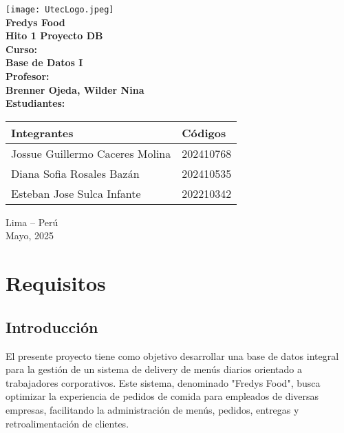 \documentclass[12pt,a4paper]{article}
\begin{document}
\begin{center}
    \texttt{[image: UtecLogo.jpeg]} \\
    \vspace{1cm}
    \normalsize \textbf{Fredys Food} \\
    \vspace{1cm}
    \textbf{Hito 1 Proyecto DB} \\
    \vspace{0.5cm}
    \textbf{Curso:} \\
    \textbf{Base de Datos I} \\
    \vspace{0.5cm}
    \textbf{Profesor:} \\
    \textbf{Brenner Ojeda, Wilder Nina} \\
    \vspace{0.5cm}
    \textbf{Estudiantes:}
\end{center}

\vspace{0.5cm}

\begin{table}[h]
    \centering
    \begin{tabular}{|>{\raggedright\arraybackslash}m{6cm}|m{3cm}|}
    \hline
    \textbf{Integrantes} & \textbf{Códigos} \\ \hline
    Jossue Guillermo Caceres Molina & 202410768 \\ \hline
    Diana Sofia Rosales Bazán & 202410535 \\ \hline
    Esteban Jose Sulca Infante & 202210342 \\ \hline
    \end{tabular}
\end{table}

\vfill
\begin{center}
    Lima -- Perú \\
    Mayo, 2025
\end{center}

\newpage

\tableofcontents
\newpage

\section{Requisitos}
\subsection{Introducción}
El presente proyecto tiene como objetivo desarrollar una base de datos integral para la gestión de un sistema de delivery de menús diarios orientado a trabajadores corporativos. Este sistema, denominado "Fredys Food", busca optimizar la experiencia de pedidos de comida para empleados de diversas empresas, facilitando la administración de menús, pedidos, entregas y retroalimentación de clientes.
\end{document}
